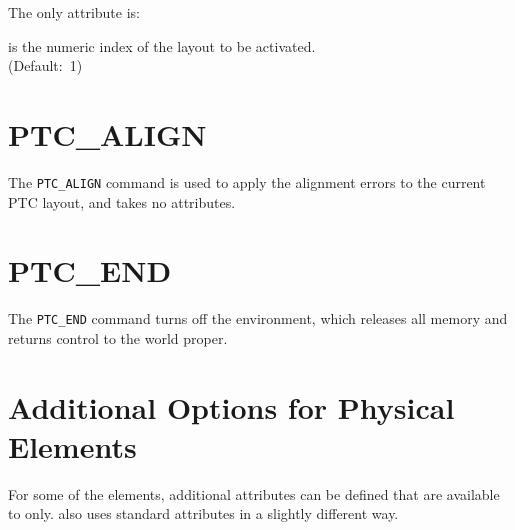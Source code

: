 
The only attribute is:
\begin{madlist}
    is the numeric index of the \ptc layout to be
   activated.\\ (Default:~1) \\
\end{madlist}

\section{PTC\_ALIGN}
\label{sec:ptc_align}

The {\tt PTC\_ALIGN} command is used to apply the \madx alignment
errors to the current PTC layout, and takes no attributes.



\section{PTC\_END}
\label{sec:ptc_end}

The {\tt PTC\_END} command turns off the \ptc environment,
which releases all memory and returns control to the \madx world proper.



\section{Additional Options for Physical Elements}
\label{sec:add_option_PTC}

For some of the \madx elements, additional attributes can be defined
that are available to \ptc only. \ptc also uses standard \madx
attributes in a slightly different way.


